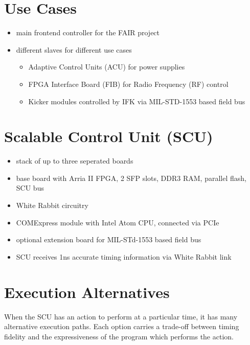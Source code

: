 \documentclass[25pt,halfparskip-,pagesize]{scrartcl}
\begin{document}
\begin{multicols*}{3}
\section{Use Cases}
\begin{itemize}
	\item main frontend controller for the FAIR project
        \item different slaves for different use cases
        \begin{itemize} 
	  \item Adaptive Control Units (ACU) for power supplies
          \item FPGA Interface Board (FIB) for Radio Frequency (RF) control
          \item Kicker modules controlled by IFK via MIL-STD-1553 based field bus
        \end{itemize}
\end{itemize}

\section{Scalable Control Unit (SCU)}
\begin{itemize}
  \item stack of up to three seperated boards
  \item base board with Arria II FPGA, 2 SFP slots, DDR3 RAM, parallel flash, SCU bus
  \item White Rabbit circuitry
  \item COMExpress module with Intel Atom CPU, connected via PCIe
  \item optional extension board for MIL-STd-1553 based field bus
  \item SCU receives 1ns accurate timing information via White Rabbit link
\end{itemize}

\section{Execution Alternatives}
When the SCU has an action to perform at a particular time,
it has many alternative execution paths.
Each option carries a trade-off between timing fidelity and
the expressiveness of the program which performs the action.


\end{multicols*}
\end{document}
